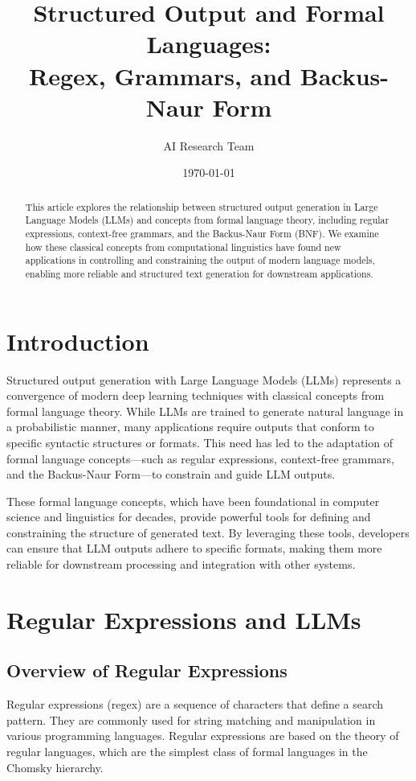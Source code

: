 \documentclass{article}
\title{Structured Output and Formal Languages: \\ Regex, Grammars, and Backus-Naur Form}
\author{AI Research Team}
\date{\today}
\begin{document}
\maketitle

\begin{abstract}
This article explores the relationship between structured output generation in Large Language Models (LLMs) and concepts from formal language theory, including regular expressions, context-free grammars, and the Backus-Naur Form (BNF). We examine how these classical concepts from computational linguistics have found new applications in controlling and constraining the output of modern language models, enabling more reliable and structured text generation for downstream applications.
\end{abstract}

\section{Introduction}

Structured output generation with Large Language Models (LLMs) represents a convergence of modern deep learning techniques with classical concepts from formal language theory. While LLMs are trained to generate natural language in a probabilistic manner, many applications require outputs that conform to specific syntactic structures or formats. This need has led to the adaptation of formal language concepts—such as regular expressions, context-free grammars, and the Backus-Naur Form—to constrain and guide LLM outputs.

These formal language concepts, which have been foundational in computer science and linguistics for decades, provide powerful tools for defining and constraining the structure of generated text. By leveraging these tools, developers can ensure that LLM outputs adhere to specific formats, making them more reliable for downstream processing and integration with other systems.

\section{Regular Expressions and LLMs}

\subsection{Overview of Regular Expressions}

Regular expressions (regex) are a sequence of characters that define a search pattern. They are commonly used for string matching and manipulation in various programming languages. Regular expressions are based on the theory of regular languages, which are the simplest class of formal languages in the Chomsky hierarchy.
\end{document}
